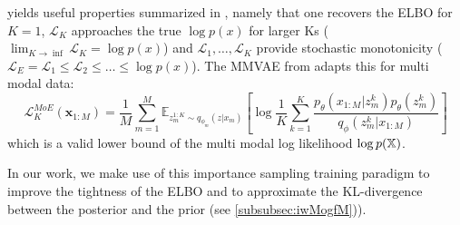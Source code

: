  yields useful properties summarized in \parencite{nowozin_debiasing_2018}, namely that one recovers the ELBO for $K=1$, $\mathcal{L}_K$ approaches the true $\log p(x)$ for larger Ks ($\lim _{K \rightarrow \inf} \mathcal{L}_K = \log p(x)$) and $\mathcal{L}_1, \ldots, \mathcal{L}_K$ provide stochastic monotonicity ($\mathcal{L}_E = \mathcal{L}_1 \leq \mathcal{L}_2 \leq \ldots \leq \log p(x)$).
The MMVAE from \parencite{shi2019variational} adapts this for multi modal data:
\begin{equation}
    \label{eq:iwelbommvae}
    \mathcal{L}^{MoE}_K(\textbf{x}_{1:M}) =
    \frac{1}{M} \sum _{m=1} ^M \mathbb{E}_{z_m^{1:K} \sim q_{\phi_m}(z|x_m)}\left[ \log \frac{1}{K} \sum ^K _{k=1} \frac{p_{\theta}(x_{1:M}|z_m^k)p_{\theta}(z^k_m)}{q_{\phi}(z_m^k| x_{1:M})} \right]
\end{equation}
which is a valid lower bound of the multi modal log likelihood $\log p(\mathbb{X})$.

In our work, we make use of this importance sampling training paradigm to improve the tightness of the ELBO and to approximate the KL-divergence between the posterior and the prior (see \cref{subsubsec:iwMogfM})).

